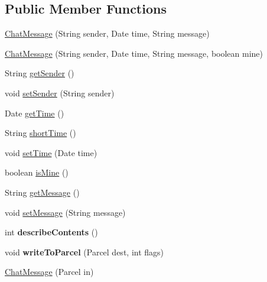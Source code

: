 \subsection*{Public Member Functions}
\begin{DoxyCompactItemize}
\item 
\hyperlink{classat_1_1fhooe_1_1kls_1_1_chat_message_a24f4cb9756c0eb7a168ddf2e6f80b05d}{Chat\-Message} (String sender, Date time, String message)
\item 
\hyperlink{classat_1_1fhooe_1_1kls_1_1_chat_message_ad5bc6cd15c36ba777d856d53626098a9}{Chat\-Message} (String sender, Date time, String message, boolean mine)
\item 
String \hyperlink{classat_1_1fhooe_1_1kls_1_1_chat_message_a25940569abe45e970d3b351ff0507a08}{get\-Sender} ()
\item 
void \hyperlink{classat_1_1fhooe_1_1kls_1_1_chat_message_a8538e45c9f07fdf4791887e1cfcd3665}{set\-Sender} (String sender)
\item 
Date \hyperlink{classat_1_1fhooe_1_1kls_1_1_chat_message_a2f2f6f6bea105a0d6390e6a34e4a56d3}{get\-Time} ()
\item 
String \hyperlink{classat_1_1fhooe_1_1kls_1_1_chat_message_af5663aa93023a4b441b62e94cdb5b3cd}{short\-Time} ()
\item 
void \hyperlink{classat_1_1fhooe_1_1kls_1_1_chat_message_a3115548076fb7f9f9011d96c18c59a0d}{set\-Time} (Date time)
\item 
boolean \hyperlink{classat_1_1fhooe_1_1kls_1_1_chat_message_a62f6949b5f65291bdb2b0cec07e2da6c}{is\-Mine} ()
\item 
String \hyperlink{classat_1_1fhooe_1_1kls_1_1_chat_message_a8c0abe210a465fa07c99bfb79b233da4}{get\-Message} ()
\item 
void \hyperlink{classat_1_1fhooe_1_1kls_1_1_chat_message_a4619e39a295e37a81ad89996ef303ba6}{set\-Message} (String message)
\item 
\hypertarget{classat_1_1fhooe_1_1kls_1_1_chat_message_a3f383cb659c40709c9bedad6778706c8}{int {\bfseries describe\-Contents} ()}\label{classat_1_1fhooe_1_1kls_1_1_chat_message_a3f383cb659c40709c9bedad6778706c8}

\item 
\hypertarget{classat_1_1fhooe_1_1kls_1_1_chat_message_a714e57568c9667129fe86dd81f0eea02}{void {\bfseries write\-To\-Parcel} (Parcel dest, int flags)}\label{classat_1_1fhooe_1_1kls_1_1_chat_message_a714e57568c9667129fe86dd81f0eea02}

\item 
\hyperlink{classat_1_1fhooe_1_1kls_1_1_chat_message_a2a2fc79c5b7634ff61c3efab5ebba0cf}{Chat\-Message} (Parcel in)
\end{DoxyCompactItemize}
